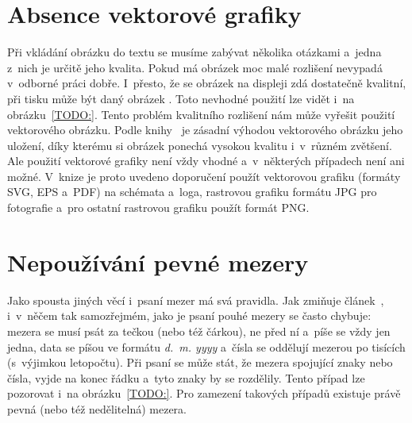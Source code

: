 \section{Absence vektorové grafiky}
Při vkládání obrázku do textu se musíme zabývat několika otázkami a~jedna z~nich
je určitě jeho kvalita. Pokud má obrázek moc malé rozlišení
nevypadá v~odborné práci dobře. I~přesto, že se obrázek na displeji zdá
dostatečně kvalitní, při tisku může být daný obrázek .
Toto nevhodné použití lze vidět i~na obrázku~\ref{TODO:}.
Tento problém kvalitního rozlišení nám může vyřešit použití vektorového obrázku.
Podle knihy~\cite{Pruvodce_tvorbou_dokumentu} je zásadní výhodou vektorového
obrázku jeho uložení, díky kterému si obrázek ponechá vysokou kvalitu i~v~různém
zvětšení. Ale použití vektorové grafiky není vždy vhodné a~v~některých případech
není ani možné. V~knize je proto uvedeno doporučení použít vektorovou grafiku
(formáty SVG, EPS a~PDF) na schémata a~loga, rastrovou grafiku formátu JPG pro
fotografie a~pro ostatní rastrovou grafiku použít formát PNG.



\section{Nepoužívání pevné mezery}
Jako spousta jiných věcí i~psaní mezer má svá pravidla. Jak zmiňuje
článek~\cite{Ctenar_12_2015}, i~v~něčem tak samozřejmém, jako je psaní pouhé
mezery se často chybuje: mezera se musí psát za tečkou (nebo též čárkou), ne před
ní a~píše se vždy jen jedna, data se píšou ve formátu \emph{d.~m. yyyy}
a~čísla se oddělují mezerou po tisících (s~výjimkou letopočtu). Při psaní se může
stát, že mezera spojující znaky nebo čísla, vyjde na konec řádku a~tyto znaky
by se rozdělily. Tento případ lze pozorovat i~na obrázku~\ref{TODO:}.
Pro zamezení takových případů existuje právě pevná (nebo též nedělitelná)
mezera.

